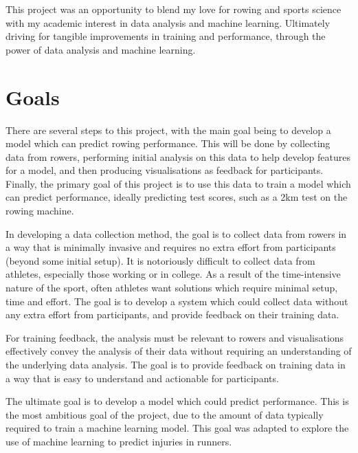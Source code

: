 This project was an opportunity to blend my love for rowing and sports science with my academic interest in data analysis and machine learning.  Ultimately driving for tangible improvements in training and performance, through the power of data analysis and machine learning.


\section{Goals}
There are several steps to this project, with the main goal being to develop a model which can predict rowing performance. This will be done by collecting data from rowers, performing initial analysis on this data to help develop features for a model, and then producing visualisations as feedback for participants. Finally, the primary goal of this project is to use this data to train a model which can predict performance, ideally predicting test scores, such as a 2km test on the rowing machine.

In developing a data collection method, the goal is to collect data from rowers in a way that is minimally invasive and requires no extra effort from participants (beyond some initial setup). It is notoriously difficult to collect data from athletes, especially those working or in college. As a result of the time-intensive nature of the sport, often athletes want solutions which require minimal setup, time and effort. The goal is to develop a system which could collect data without any extra effort from participants, and provide feedback on their training data.

For training feedback, the analysis must be relevant to rowers and visualisations effectively convey the analysis of their data without requiring an understanding of the underlying data analysis. The goal is to provide feedback on training data in a way that is easy to understand and actionable for participants.

The ultimate goal is to develop a model which could predict performance. This is the most ambitious goal of the project, due to the amount of data typically required to train a machine learning model. This goal was adapted to explore the use of machine learning to predict injuries in runners.

